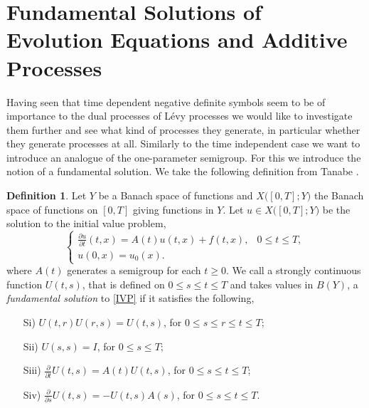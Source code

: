 \documentclass[a4paper, 12pt]{report}
\theoremstyle{remark}
\theoremstyle{definition}
\newtheorem{definition}[theorem]{Definition}
\begin{document}
\section{Fundamental Solutions of Evolution Equ\-ations and Additive Processes}\label{Se.FSoEEaAP}

Having seen that time dependent negative definite symbols seem to be of importance to the dual processes of L\'evy processes we would like to investigate them further and see what kind of processes they generate, in particular whether they generate processes at all.  Similarly to the time independent case we want to introduce an analogue of the one-parameter semigroup.  For this we introduce the notion of a fundamental solution.  We take the following definition from Tanabe \cite{Tanabe}.

\begin{definition}
Let $Y$ be a Banach space of functions and $X\big([0, T]; Y\big)$ the Banach space of functions on $[0, T]$ giving functions in $Y$.  Let $u \in X\big([0, T]; Y\big)$ be the solution to the initial value problem,
\begin{equation}\label{IVP}
\begin{cases}
\frac{\partial u}{\partial t}(t, x) = A(t)u(t, x) + f(t, x), & 0 \le t \le T,\\
u(0, x) = u_0(x).
\end{cases}
\end{equation}
where $A(t)$ generates a semigroup for each $t \ge 0$.  We call a strongly continuous function $U(t, s)$, that is defined on $0 \le s \le t \le T$ and takes values in $B(Y)$, a \emph{fundamental solution} to \eqref{IVP} if it satisfies the following,
\begin{itemize}

\item[Si)] $U(t, r)U(r, s) = U(t, s)$, for $0 \le s \le r \le t \le T$;

\item[Sii)] $U(s, s) = I$, for $0 \le s \le T$;

\item[Siii)] $\frac{\partial}{\partial t}U(t, s) = A(t)U(t, s)$, for $0 \le s \le t \le T$;

\item[Siv)] $\frac{\partial}{\partial s}U(t, s) = -U(t, s)A(s)$, for $0 \le s \le t \le T$.

\end{itemize}
\end{definition}
\end{document}
